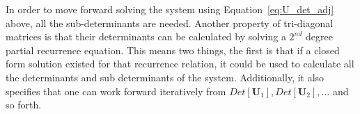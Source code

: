 \documentclass[review]{elsarticle}
\let\bs\boldsymbol
\begin{document}
%
%
%
%
%

In order to move forward solving the system using Equation~\ref{eq:U_det_adj} above, all the sub-determinants are needed. Another property of tri-diagonal matrices is that their determinants can be calculated by solving a $2^{nd}$ degree partial recurrence equation. This means two things, the first is that if a closed form solution existed for that recurrence relation, it could be used to calculate all the determinants and sub determinants of the system. Additionally, it also specifies that one can work forward iteratively from $Det[\bs{U}_{1}], Det[\bs{U}_{2}], ...$ and so forth.
\end{document}
